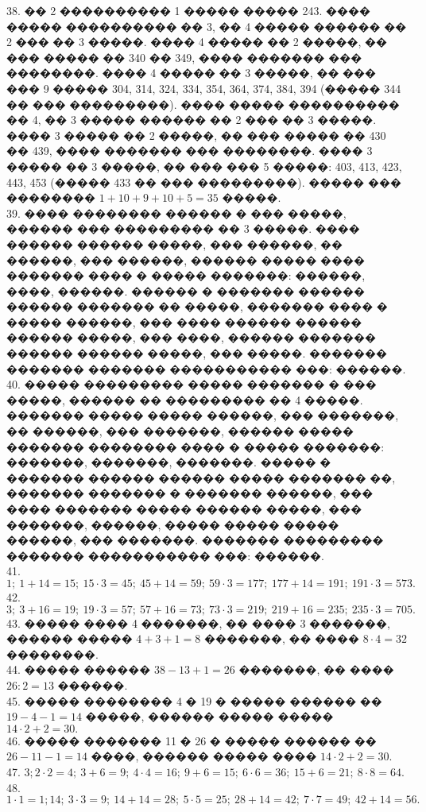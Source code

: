 \documentclass[12pt]{article}
\begin{document}
38. �� 2 ���������� 1 ����� ����� 243. ���� ����� ���������� �� 3, �� 4 ����� ������ �� 2 ��� �� 3 �����. ���� 4 ����� �� 2 �����, �� ��� ����� �� 340 �� 349, ���� ������� ��� ��������. ���� 4 ����� �� 3 �����, �� ��� ��� 9 ����� 304, 314, 324, 334, 354, 364, 374, 384, 394 (����� 344 �� ��� ���������). ���� ����� ���������� �� 4, �� 3 ����� ������ �� 2 ��� �� 3 �����. ���� 3 ����� �� 2 �����, �� ��� ����� �� 430 �� 439, ���� ������� ��� ��������. ���� 3 ����� �� 3 �����, �� ��� ��� 5 �����: 403, 413, 423, 443, 453 (����� 433 �� ��� ���������). ����� ��� �������� $1+10+9+10+5=35$ �����.\\
39. ���� �������� ������ � ��� �����, ������ ��� ��������� �� 3 �����. ���� ������ ������ �����, ��� ������, �� ������, ��� ������, ������ ����� ���� ������� ���� � ����� �������: ������, ����, ������. ������ � ������� ������ ������ ������� �� �����, ������� ���� � ����� ������, ��� ���� ������ ������ ������ �����, ��� ����, ������ ������� ������ ������ �����, ��� �����. ������� ������� ������� ����������� ���: ������.\\
40. ����� ��������� ����� ������� � ��� �����, ������ �� ��������� �� 4 �����. ������� ����� ����� ������, ��� �������, �� ������, ��� �������, ������ ����� ������� �������� ���� � ����� �������: �������, �������, �������. ����� � ������� ������ ������ ����� ������� ��, ������� ������� � ������� ������, ��� ���� ������� ����� ������ �����, ��� �������, ������, ����� ����� ����� ������, ��� �������. ������� ��������� ������� ����������� ���: ������.\\
41. $1;\ 1+14=15;\ 15\cdot3=45;\ 45+14=59;\ 59\cdot3=177;\ 177+14=191;\ 191\cdot3=573.$\\
42. $3;\ 3+16=19;\ 19\cdot3=57;\ 57+16=73;\ 73\cdot3=219;\ 219+16=235;\ 235\cdot3=705.$\\
43. ����� ���� 4 �������, �� ���� 3 �������, ������ ����� $4+3+1=8$ �������, �� ���� $8\cdot4=32$ ��������.\\
44. ����� ������ $38-13+1=26$ �������, �� ���� $26:2=13$ ������.\\
45. ����� �������� 4 � 19 � ����� ������ �� $19-4-1=14$ �����, ������ ����� ����� $14\cdot2+2=30.$\\
46. ����� ������� 11 � 26 � ����� ������ �� $26-11-1=14$ ����, ������ ����� ���� $14\cdot2+2=30.$\\
47. $3; 2\cdot2=4;\ 3+6=9;\ 4\cdot4=16;\ 9+6=15;\ 6\cdot6=36;\ 15+6=21;\ 8\cdot8=64.$\\
48. $1\cdot1=1; 14;\ 3\cdot3=9;\ 14+14=28;\ 5\cdot5=25;\ 28+14=42;\ 7\cdot7=49;\ 42+14=56.$\\
\end{document}
